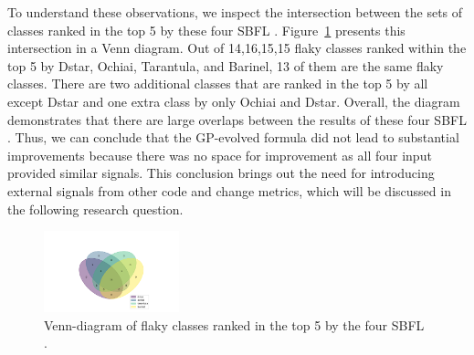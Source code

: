 To understand these observations, we inspect the intersection between the sets of classes ranked in the top 5 by these four SBFL \formulas. Figure~\ref{fig:sbfl_venn} presents this intersection in a Venn diagram.
Out of 14,16,15,15 flaky classes ranked within the top 5 by Dstar, Ochiai, Tarantula, and Barinel, 13 of them are the same flaky classes. There are two additional classes that are ranked in the top 5 by all except Dstar and one extra class by only Ochiai and Dstar.
Overall, the diagram demonstrates that there are large overlaps between the results of these four SBFL \formulas. 
Thus, we can conclude that the GP-evolved formula did not lead to substantial improvements because there was no space for improvement as all four input \formulas provided similar signals. 
This conclusion brings out the need for introducing external signals from other code and change metrics, which will be discussed in the following research question.


\begin{figure}[ht]
\vspace{-2.2em}
\centering
\includegraphics[width=0.35\textwidth, trim=40mm 0mm 40mm 30mm, clip]{figures/sherloc/venn_sbfls.pdf}
\vspace{-0.8em}
\caption{Venn-diagram of flaky classes ranked in the top 5 by the four SBFL \formulas.} 
\label{fig:sbfl_venn}
\vspace{-0.6em}
\end{figure}

